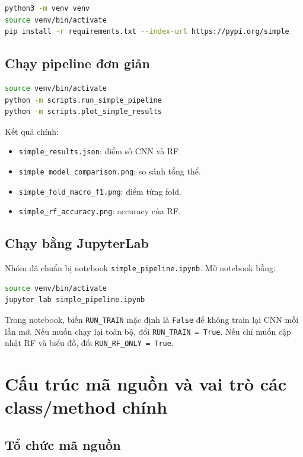 \documentclass[12pt,a4paper]{article}
\begin{document}
\begin{lstlisting}[language=bash]
python3 -m venv venv
source venv/bin/activate
pip install -r requirements.txt --index-url https://pypi.org/simple
\end{lstlisting}

\subsection{Chạy pipeline đơn giản}

\begin{lstlisting}[language=bash]
source venv/bin/activate
python -m scripts.run_simple_pipeline
python -m scripts.plot_simple_results
\end{lstlisting}

Kết quả chính:

\begin{itemize}
    \item \texttt{simple\_results.json}: điểm số CNN và RF.
    \item \texttt{simple\_model\_comparison.png}: so sánh tổng thể.
    \item \texttt{simple\_fold\_macro\_f1.png}: điểm từng fold.
    \item \texttt{simple\_rf\_accuracy.png}: accuracy của RF.
\end{itemize}

\subsection{Chạy bằng JupyterLab}

Nhóm đã chuẩn bị notebook \texttt{simple\_pipeline.ipynb}. Mở notebook bằng:

\begin{lstlisting}[language=bash]
source venv/bin/activate
jupyter lab simple_pipeline.ipynb
\end{lstlisting}

Trong notebook, biến \texttt{RUN\_TRAIN} mặc định là \texttt{False} để không train lại CNN mỗi lần mở. Nếu muốn chạy lại toàn bộ, đổi \texttt{RUN\_TRAIN = True}. Nếu chỉ muốn cập nhật RF và biểu đồ, đổi \texttt{RUN\_RF\_ONLY = True}.

\section{Cấu trúc mã nguồn và vai trò các class/method chính}

\subsection{Tổ chức mã nguồn}
\end{document}
